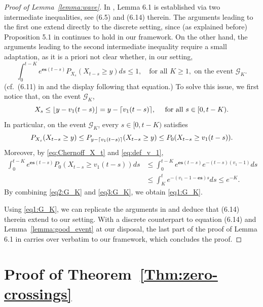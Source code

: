 \documentclass[12pt,reqno,oneside]{amsart}
\numberwithin{equation}{section}
\theoremstyle{definition}
\theoremstyle{remark}
\newcommand{\es}{\mathbf{es}}
\DeclarePairedDelimiter{\ceil}{\lceil}{\rceil}
\DeclarePairedDelimiter{\floor}{\lfloor}{\rfloor}
\begin{document}
\begin{proof}[Proof of Lemma~\ref{lemma:wave}]
In \cite{CDO25}, Lemma 6.1 is established via two intermediate inequalities, see (6.5) and (6.14) therein. The arguments leading to the first one extend directly to the discrete setting, since (as explained before) Proposition 5.1 in \cite{CDO25} continues to hold in our framework.
On the other hand, the arguments leading to the second intermediate inequality require a small adaptation, as it is a priori not clear whether, in our setting,
\begin{equation}\label{eq1:G_K}
    \int_{0}^{t-K} e^{\es(t-s)}P_{X_s}(X_{t-s} \geq y)ds \leq 1, \quad  \text{for all } K \geq 1, \text{ on the event } \mathcal{G}_K.
\end{equation}
(cf.~(6.11) in \cite{CDO25} and the display following that equation.)
To solve this issue, we first notice that, on the event $\mathcal{G}_K$,
\begin{equation*}
    X_s \leq \floor{y-v_1(t-s)}= y- \ceil{v_1(t-s)}, \quad \text{ for all } s \in [0, t-K).
\end{equation*}
In particular, on the event $\mathcal{G}_K$, every $s \in [0, t-K)$ satisfies
\begin{equation}\label{eq2:G_K}
     P_{X_s}(X_{t-s} \geq y) \leq P_{y- \ceil{v_1(t-s)}}(X_{t-s} \geq y) \leq  P_{0}(X_{t-s} \geq v_1(t-s)).
\end{equation}
Moreover, by \eqref{eq:Chernoff_X_t} and \eqref{eq:def_v_1},
\begin{equation}
  \label{eq3:G_K}
  \begin{aligned}
    \int_0^{t-K}e^{\es(t-s)}P_0(X_{t-s} \geq v_1 (t-s)) ds &
  \leq \int_0^{t-K}e^{\es(t-s)} e^{-(t-s)(v_1-1)}ds
  \\ &\leq \int_K^t e^{-(v_1-1-\es)s}ds \leq e^{-K}.
  \end{aligned}
\end{equation}
By combining \eqref{eq2:G_K} and \eqref{eq3:G_K}, we obtain \eqref{eq1:G_K}.

Using \eqref{eq1:G_K}, we can replicate the arguments in \cite{CDO25} and deduce that (6.14) therein extend to our setting.
With a discrete counterpart to equation (6.14) and Lemma~\ref{lemma:good_event} at our disposal, the last part of the proof of Lemma 6.1 in \cite{CDO25} carries over verbatim to our framework, which concludes the proof.
\end{proof}

\section{Proof of Theorem~\ref{Thm:zero-crossings}}
\label{sec:proof_zero_crossings}
\end{document}
